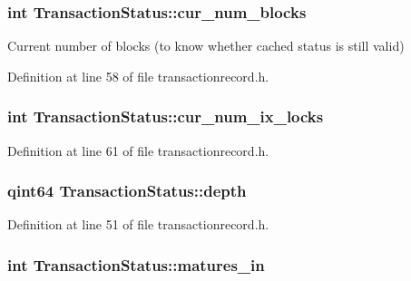 \subsubsection[{cur\+\_\+num\+\_\+blocks}]{\setlength{\rightskip}{0pt plus 5cm}int Transaction\+Status\+::cur\+\_\+num\+\_\+blocks}\label{class_transaction_status_a22839cc23993e849a6c9fed8bffd5f50}
Current number of blocks (to know whether cached status is still valid) 

Definition at line 58 of file transactionrecord.\+h.

\hypertarget{class_transaction_status_a5dd91f2741963d7e68990fdf5f33c2da}{}
\subsubsection[{cur\+\_\+num\+\_\+ix\+\_\+locks}]{\setlength{\rightskip}{0pt plus 5cm}int Transaction\+Status\+::cur\+\_\+num\+\_\+ix\+\_\+locks}\label{class_transaction_status_a5dd91f2741963d7e68990fdf5f33c2da}


Definition at line 61 of file transactionrecord.\+h.

\hypertarget{class_transaction_status_ac8a3bd9c1ad3969c6f969418fcffa0ca}{}
\subsubsection[{depth}]{\setlength{\rightskip}{0pt plus 5cm}qint64 Transaction\+Status\+::depth}\label{class_transaction_status_ac8a3bd9c1ad3969c6f969418fcffa0ca}


Definition at line 51 of file transactionrecord.\+h.

\hypertarget{class_transaction_status_a6714606658df9486e4a3f8f2be5d28b4}{}
\subsubsection[{matures\+\_\+in}]{\setlength{\rightskip}{0pt plus 5cm}int Transaction\+Status\+::matures\+\_\+in}\label{class_transaction_status_a6714606658df9486e4a3f8f2be5d28b4}


